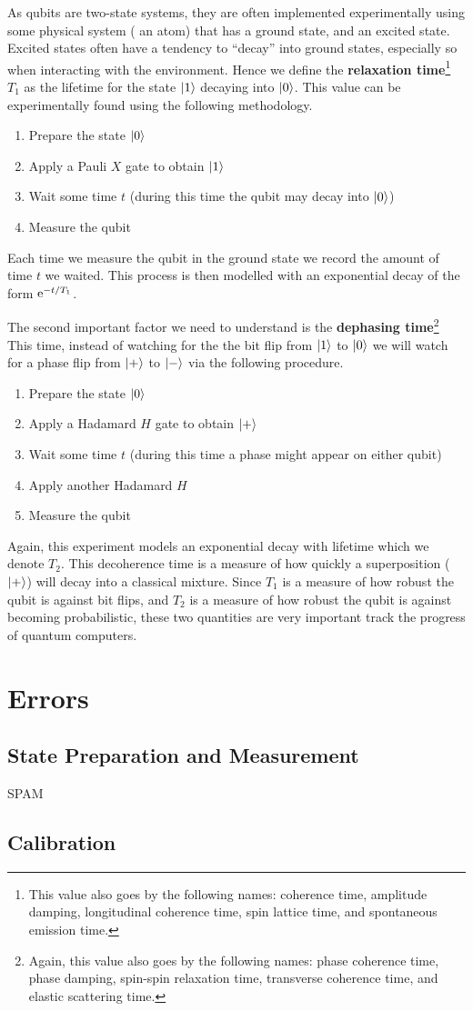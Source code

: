 As qubits are two-state systems, they are often implemented experimentally using some physical system (\eg{} an atom) that has a ground state, and an excited state.
Excited states often have a tendency to ``decay'' into ground states, especially so when interacting with the environment.
Hence we define the \textbf{relaxation time}\footnote{This value also goes by the following names: coherence time, amplitude damping, longitudinal coherence time, spin lattice time, and spontaneous emission time.} $T_1$ as the lifetime for the state $\ket{1}$ decaying into $\ket{0}$.
This value can be experimentally found using the following methodology.
\begin{enumerate}
    \item Prepare the state $\ket{0}$
    \item Apply a Pauli $X$ gate to obtain $\ket{1}$
    \item Wait some time $t$ (during this time the qubit may decay into $\ket{0}$)
    \item Measure the qubit
\end{enumerate}
Each time we measure the qubit in the ground state we record the amount of time $t$ we waited.
This process is then modelled with an exponential decay of the form $\mathrm{e}^{-t/T_1}$.

The second important factor we need to understand is the \textbf{dephasing time}\footnote{Again, this value also goes by the following names: phase coherence time, phase damping, spin-spin relaxation time, transverse coherence time, and elastic scattering time.}
This time, instead of watching for the the bit flip from $\ket{1}$ to $\ket{0}$ we will watch for a phase flip from $\ket{+}$ to $\ket{-}$ via the following procedure.
\begin{enumerate}
    \item Prepare the state $\ket{0}$
    \item Apply a Hadamard $H$ gate to obtain $\ket{+}$
    \item Wait some time $t$ (during this time a phase might appear on either qubit)
    \item Apply another Hadamard $H$
    \item Measure the qubit
\end{enumerate}
Again, this experiment models an exponential decay with lifetime which we denote $T_2$.
This decoherence time is a measure of how quickly a superposition ($\ket{+}$) will decay into a classical mixture.
Since $T_1$ is a measure of how robust the qubit is against bit flips, and $T_2$ is a measure of how robust the qubit is against becoming probabilistic, these two quantities are very important track the progress of quantum computers.


\section{Errors}

\subsection{State Preparation and Measurement}
\ac{SPAM}

\subsection{Calibration}